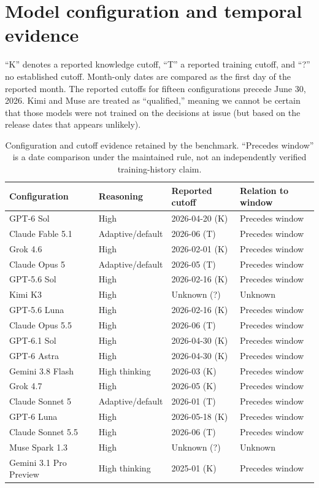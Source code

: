 \documentclass[11pt]{article}
\begin{document}
\clearpage

\appendix
\section{Model configuration and temporal evidence}
\label{app:cutoffs}\label{app:protocol}
``K'' denotes a reported knowledge cutoff, ``T'' a reported training cutoff, and ``?'' no established cutoff. Month-only dates are compared as the first day of the reported month. The reported cutoffs for fifteen configurations precede June 30, 2026. Kimi and Muse are treated as ``qualified,'' meaning we cannot be certain that those models were not trained on the decisions at issue (but based on the release dates that appears unlikely).
\begin{table}[ht]\centering\small\setlength{\tabcolsep}{4pt}
\begin{tabular}{llll}\toprule
Configuration & Reasoning & Reported cutoff & Relation to window\\\midrule
GPT-6 Sol & High & 2026-04-20 (K) & Precedes window \\
Claude Fable 5.1 & Adaptive/default & 2026-06 (T) & Precedes window \\
Grok 4.6 & High & 2026-02-01 (K) & Precedes window \\
Claude Opus 5 & Adaptive/default & 2026-05 (T) & Precedes window \\
GPT-5.6 Sol & High & 2026-02-16 (K) & Precedes window \\
Kimi K3 & High & Unknown (?) & Unknown \\
GPT-5.6 Luna & High & 2026-02-16 (K) & Precedes window \\
Claude Opus 5.5 & High & 2026-06 (T) & Precedes window \\
GPT-6.1 Sol & High & 2026-04-30 (K) & Precedes window \\
GPT-6 Astra & High & 2026-04-30 (K) & Precedes window \\
Gemini 3.8 Flash & High thinking & 2026-03 (K) & Precedes window \\
Grok 4.7 & High & 2026-05 (K) & Precedes window \\
Claude Sonnet 5 & Adaptive/default & 2026-01 (T) & Precedes window \\
GPT-6 Luna & High & 2026-05-18 (K) & Precedes window \\
Claude Sonnet 5.5 & High & 2026-06 (T) & Precedes window \\
Muse Spark 1.3 & High & Unknown (?) & Unknown \\
Gemini 3.1 Pro Preview & High thinking & 2025-01 (K) & Precedes window \\
\bottomrule\end{tabular}\caption{Configuration and cutoff evidence retained by the benchmark. ``Precedes window'' is a date comparison under the maintained rule, not an independently verified training-history claim.}\label{tab:cutoffs}\end{table}
\end{document}
